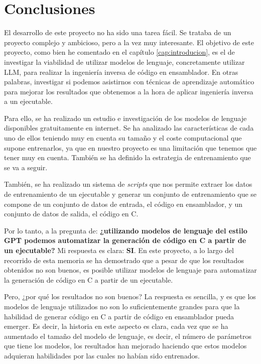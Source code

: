 \chapter{Conclusiones}
\label{cap:conclusiones}


El desarrollo de este proyecto no ha sido una tarea fácil. Se trataba de un proyecto
complejo y ambicioso, pero a la vez muy interesante. El objetivo de este proyecto,
como bien he comentado en el capítulo \ref{cap:introducion}, es el de investigar
la viabilidad de utilizar modelos de lenguaje, concretamente utilizar LLM, para
realizar la ingeniería inversa de código en ensamblador. En otras palabras, investigar
si podemos asistirnos con técnicas de aprendizaje automático para mejorar los resultados
que obtenemos a la hora de aplicar ingeniería inversa a un ejecutable.

Para ello, se ha realizado un estudio e investigación de los modelos de lenguaje
disponibles gratuitamente en internet. Se ha analizado las características de cada
uno de ellos teniendo muy en cuenta su tamaño y el coste computacional que supone
entrenarlos, ya que en nuestro proyecto es una limitación que tenemos que tener muy
en cuenta. También se ha definido la estrategia de entrenamiento que se va a seguir.

También, se ha realizado un sistema de \textit{scripts} que nos permite extraer
los datos de entrenamiento de un ejecutable y generar un conjunto de entrenamiento
que se compone de un conjunto de datos de entrada, el código en ensamblador, y un
conjunto de datos de salida, el código en C.

Por lo tanto, a la pregunta de: \textbf{¿utilizando modelos de lenguaje del estilo
GPT podemos automatizar la generación de código en C a partir de un ejecutable?} Mi
respuesta es clara: \textbf{SI}. En este proyecto, a lo largo del recorrido de esta memoria
se ha demostrado que a pesar de que los resultados obtenidos no son buenos, es posible
utilizar modelos de lenguaje para automatizar la generación de código en C a partir de
un ejecutable.

Pero, ¿por qué los resultados no son buenos? La respuesta es sencilla, y es que los
modelos de lenguaje utilizados no son lo suficientemente grandes para que la habilidad
de generar código en C a partir de código en ensamblador pueda emerger. Es decir, la historia
en este aspecto es clara, cada vez que se ha aumentado el tamaño del modelo de lenguaje, es decir,
el número de parámetros que tiene los modelos, los resultados han mejorado haciendo que estos
modelos adquieran habilidades por las cuales no habían sido entrenados.

